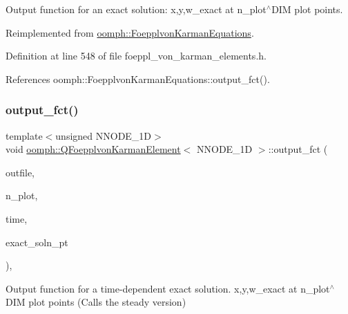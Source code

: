 Output function for an exact solution\+: x,y,w\+\_\+exact at n\+\_\+plot$^\wedge$\+D\+IM plot points. 



Reimplemented from \hyperlink{classoomph_1_1FoepplvonKarmanEquations_a2e926381021b99050cebb69a07867ebc}{oomph\+::\+Foepplvon\+Karman\+Equations}.



Definition at line 548 of file foeppl\+\_\+von\+\_\+karman\+\_\+elements.\+h.



References oomph\+::\+Foepplvon\+Karman\+Equations\+::output\+\_\+fct().

\mbox{\label{classoomph_1_1QFoepplvonKarmanElement_aaf40f9b3c63ec3e5feebccaedbe7d012}} 
\subsubsection{\texorpdfstring{output\+\_\+fct()}{output\_fct()}\hspace{0.1cm}{\footnotesize\ttfamily [2/2]}}
{\footnotesize\ttfamily template$<$unsigned N\+N\+O\+D\+E\+\_\+1D$>$ \\
void \hyperlink{classoomph_1_1QFoepplvonKarmanElement}{oomph\+::\+Q\+Foepplvon\+Karman\+Element}$<$ N\+N\+O\+D\+E\+\_\+1D $>$\+::output\+\_\+fct (\begin{DoxyParamCaption}\item[{std\+::ostream \&}]{outfile,  }\item[{const unsigned \&}]{n\+\_\+plot,  }\item[{const double \&}]{time,  }\item[{\hyperlink{classoomph_1_1FiniteElement_ad4ecf2b61b158a4b4d351a60d23c633e}{Finite\+Element\+::\+Unsteady\+Exact\+Solution\+Fct\+Pt}}]{exact\+\_\+soln\+\_\+pt }\end{DoxyParamCaption})\hspace{0.3cm}{\ttfamily [inline]}, {\ttfamily [virtual]}}



Output function for a time-\/dependent exact solution. x,y,w\+\_\+exact at n\+\_\+plot$^\wedge$\+D\+IM plot points (Calls the steady version) 



